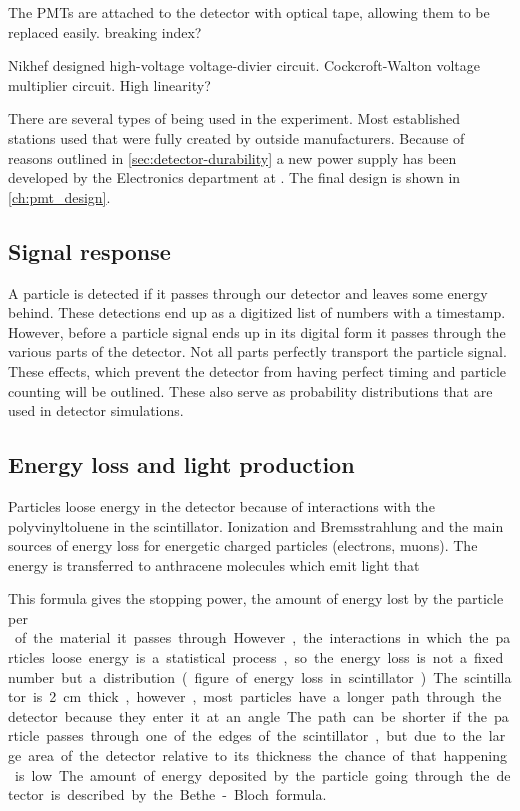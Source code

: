 The PMTs are attached to the detector with optical tape, allowing them to be replaced easily. breaking index?

Nikhef designed high-voltage voltage-divier circuit.
Cockcroft-Walton voltage multiplier circuit.
High linearity?

There are several types of \pmt being used in the \hisparc experiment. Most established stations used \pmts that were fully created by outside manufacturers. Because of reasons outlined in \cref{sec:detector-durability} a new \pmt power supply has been developed by the Electronics department at \nikhef. The final design is shown in \cref{ch:pmt_design}.



\subsection{Signal response}

A particle is detected if it passes through our detector and leaves some energy behind. These detections end up as a digitized list of numbers with a timestamp. However, before a particle signal ends up in its digital form it passes through the various parts of the detector. Not all parts perfectly transport the particle signal. These effects, which prevent the detector from having perfect timing and particle counting will be outlined. These also serve as probability distributions that are used in detector simulations.


\subsection{Energy loss and light production}

Particles loose energy in the detector because of interactions with the polyvinyltoluene in the scintillator. Ionization and Bremsstrahlung and the main sources of energy loss for energetic charged particles (electrons, muons). The energy is transferred to anthracene molecules which emit light that

This formula gives the stopping power, the amount of energy lost by the particle per \si{\gram\centi\meter\square} of the material it passes through. However, the interactions in which the particles loose energy is a statistical process, so the energy loss is not a fixed number but a distribution.

(figure of energy loss in scintillator)

The scintillator is \SI{2}{\centi\meter} thick, however, most particles have a longer path through the detector because they enter it at an angle. The path can be shorter if the particle passes through one of the edges of the scintillator, but due to the large area of the detector relative to its thickness the chance of that happening is low. The amount of energy deposited by the particle going through the detector is described by the Bethe-Bloch formula.

